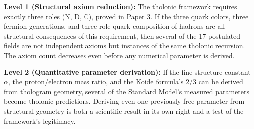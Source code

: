 \documentclass[12pt]{article}
\begin{document}
\textbf{Level 1 (Structural axiom reduction):} The tholonic framework
requires exactly three roles (N, D, C), proved in
\href{https://github.com/baardev/truevalue/blob/main/docnav/Research/papers/3_minimal-recursive-triadic-framework/3_minimal-recursive-triadic-framework.pdf}{Paper
3}. If the three quark colors, three fermion generations, and three-role
quark composition of hadrons are all structural consequences of this
requirement, then several of the 17 postulated fields are not
independent axioms but instances of the same tholonic recursion. The
axiom count decreases even before any numerical parameter is derived.

\textbf{Level 2 (Quantitative parameter derivation):} If the fine
structure constant \(\alpha\), the proton/electron mass ratio, and the
Koide formula's 2/3 can be derived from thologram geometry, several of
the Standard Model's measured parameters become tholonic predictions.
Deriving even one previously free parameter from structural geometry is
both a scientific result in its own right and a test of the framework's
legitimacy.
\end{document}
